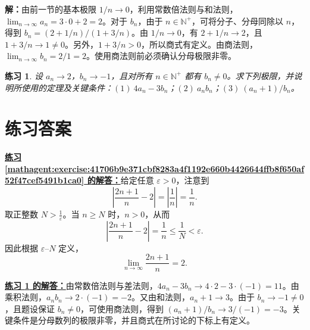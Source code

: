 \documentclass[UTF8,fontset=fandol,11pt]{ctexart}
\newtheorem{exercise}[definition]{练习}
\begin{document}
\par\noindent\textbf{解：}由前一节的基本极限 $1/n\to0$，利用常数倍法则与和法则，$\lim_{n\to\infty}a_n=3\cdot0+2=2$。对于 $b_n$，由于 $n\in\mathbb{N}^{+}$，可将分子、分母同除以 $n$，得到 $b_n=(2+1/n)/(1+3/n)$。由 $1/n\to0$，有 $2+1/n\to2$，且 $1+3/n\to1\neq0$。另外，$1+3/n>0$，所以商式有定义。由商法则，$\lim_{n\to\infty}b_n=2/1=2$。使用商法则前必须确认分母极限非零。\par
\begin{exercise}
\label{mathagent:exercise:8760977b7c41a7ab2d82304ea81f33749e9976ddafc1f87583b542c4b8793254}
设 $a_n\to2$，$b_n\to-1$，且对所有 $n\in\mathbb{N}^{+}$ 都有 $b_n\neq0$。求下列极限，并说明所使用的定理及关键条件：$(1)\ 4a_n-3b_n$；$(2)\ a_nb_n$；$(3)\ (a_n+1)/b_n$。
\end{exercise}
\section*{练习答案}
\par\noindent\textbf{\hyperref[mathagent:exercise:41706b9e371cbf8283a4f1192e660b4426644ffb8f650af52f47cef5491b1ca0]{练习 \ref*{mathagent:exercise:41706b9e371cbf8283a4f1192e660b4426644ffb8f650af52f47cef5491b1ca0} 的解答：}}给定任意 $\varepsilon>0$，注意到
\[
\left|\frac{2n+1}{n}-2\right|=\left|\frac{1}{n}\right|=\frac{1}{n}.
\]
取正整数 $N>\frac{1}{\varepsilon}$。当 $n\geq N$ 时，$n>0$，从而
\[
\left|\frac{2n+1}{n}-2\right|=\frac{1}{n}\leq\frac{1}{N}<\varepsilon.
\]
因此根据 $\varepsilon$--$N$ 定义，
\[
\lim_{n\to\infty}\frac{2n+1}{n}=2.
\]\par
\par\noindent\textbf{\hyperref[mathagent:exercise:8760977b7c41a7ab2d82304ea81f33749e9976ddafc1f87583b542c4b8793254]{练习 \ref*{mathagent:exercise:8760977b7c41a7ab2d82304ea81f33749e9976ddafc1f87583b542c4b8793254} 的解答：}}由常数倍法则与差法则，$4a_n-3b_n\to4\cdot2-3\cdot(-1)=11$。由乘积法则，$a_nb_n\to2\cdot(-1)=-2$。又由和法则，$a_n+1\to3$。由于 $b_n\to-1\neq0$，且题设保证 $b_n\neq0$，可使用商法则，得到 $(a_n+1)/b_n\to3/(-1)=-3$。关键条件是分母数列的极限非零，并且商式在所讨论的下标上有定义。\par
\end{document}
